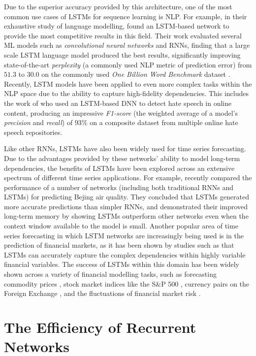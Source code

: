 \documentclass[a4paper, 11pt]{report}
\begin{document}
    Due to the superior accuracy provided by this architecture, one of the most common use cases of LSTMs for sequence learning is NLP. For example, in their exhaustive study of language modelling, \citet{jozefowicz-2016} found an LSTM-based network to provide the most competitive results in this field. Their work evaluated several ML models such as \emph{convolutional neural networks} and RNNs, finding that a large scale LSTM language model produced the best results, significantly improving state-of-the-art \emph{perplexity} (a commonly used NLP metric of prediction error) from $51.3$ to $30.0$ on the commonly used \emph{One Billion Word Benchmark} dataset \citep{chelba-2013}. Recently, LSTM models have been applied to even more complex tasks within the NLP space due to the ability to capture high-fidelity dependencies. This includes the work of \citet{saleh-2021} who used an LSTM-based DNN to detect hate speech in online content, producing an impressive \emph{F1-score} (the weighted average of a model's \emph{precision} and \emph{recall}) of $93\%$ on a composite dataset from multiple online hate speech repositories.

    Like other RNNs, LSTMs have also been widely used for time series forecasting. Due to the advantages provided by these networks' ability to model long-term dependencies, the benefits of LSTMs have been explored across an extensive spectrum of different time series applications. For example, \citet{shi-2022} recently compared the performance of a number of networks (including both traditional RNNs and LSTMs) for predicting Bejing air quality. They concluded that LSTMs generated more accurate predictions than simpler RNNs, and demonstrated their improved long-term memory by showing LSTMs outperform other networks even when the context window available to the model is small. Another popular area of time series forecasting in which LSTM networks are increasingly being used is in the prediction of financial markets, as it has been shown by studies such as \citet{li-2017} that LSTMs can accurately capture the complex dependencies within highly variable financial variables. The success of LSTMs within this domain has been widely shown across a variety of financial modelling tasks, such as forecasting commodity prices \citep{ly-2021}, stock market indices like the S\&P 500 \citep{fjellstrom-2022}, currency pairs on the Foreign Exchange \citep{qi-2021}, and the fluctuations of financial market risk \citep{du-2019}.


    \section{The Efficiency of Recurrent Networks}
\end{document}
